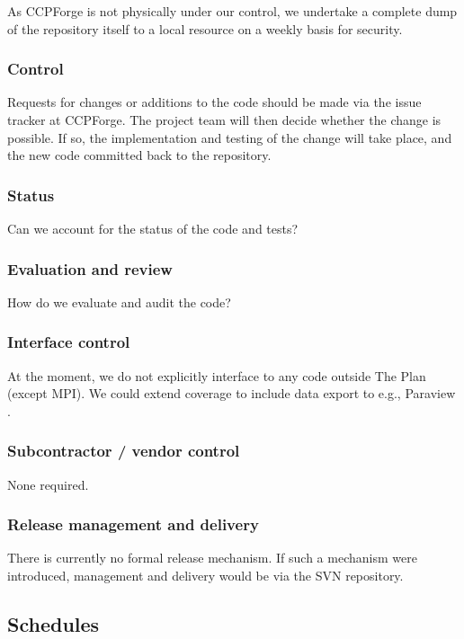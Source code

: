 \documentclass[11pt,twoside]{article}
\begin{document}
As CCPForge is not physically under our control, we undertake a
complete dump of the repository itself to a local resource on a
weekly basis for security.

\subsubsection{Control}

Requests for changes or additions to the code should be made via
the issue tracker at CCPForge. The project team will then decide
whether the change is possible. If so, the implementation and
testing of the change will take place, and the new code committed
back to the repository.


\subsubsection{Status}

Can we account for the status of the code and tests?

\subsubsection{Evaluation and review}

How do we evaluate and audit the code?

\subsubsection{Interface control}

At the moment, we do not explicitly interface to any code outside The
Plan (except MPI). We could extend coverage to include data export
to e.g., Paraview \cite{paraview}.

\subsubsection{Subcontractor / vendor control}

None required.

\subsubsection{Release management and delivery}

There is currently no formal release mechanism. If such a mechanism were
introduced, management and  delivery would be via the SVN repository.

\subsection{Schedules}
\end{document}

